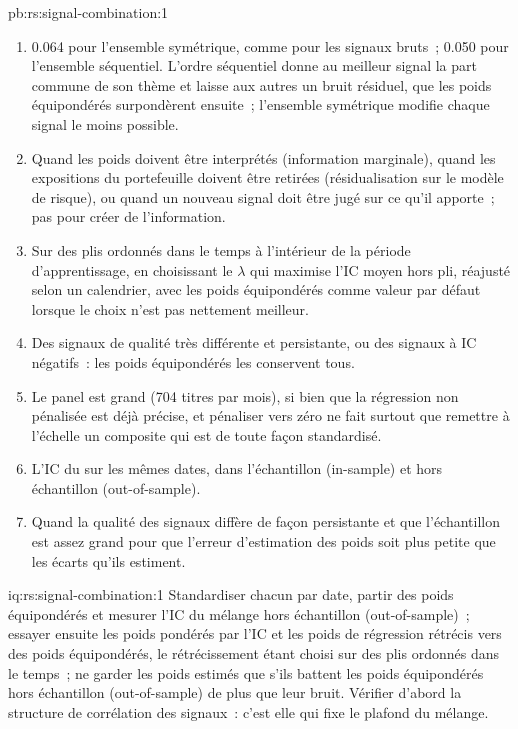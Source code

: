 \begin{solution}{pb:rs:signal-combination:1}
\begin{enumerate}
que ne le permet la diversification de leurs erreurs, et ici une seule base dominait.
\item 0.064 pour l'ensemble symétrique, comme pour les signaux bruts~; 0.050 pour l'ensemble séquentiel. L'ordre séquentiel donne au meilleur signal la
part commune de son thème et laisse aux autres un bruit résiduel, que les poids équipondérés surpondèrent ensuite~; l'ensemble symétrique modifie chaque signal le moins possible.
\item Quand les poids doivent être interprétés (information marginale), quand les expositions du portefeuille doivent être retirées (résidualisation sur le modèle de risque), ou quand un nouveau
signal doit être jugé sur ce qu'il apporte~; pas pour créer de l'information.
\item Sur des plis ordonnés dans le temps à l'intérieur de la période d'apprentissage, en choisissant le $\lambda$ qui maximise l'IC moyen hors pli, réajusté selon un calendrier, avec
les poids équipondérés comme valeur par défaut lorsque le choix n'est pas nettement meilleur.
\item Des signaux de qualité très différente et persistante, ou des signaux à IC négatifs~: les poids équipondérés les conservent tous.
\item Le panel est grand (704 titres par mois), si bien que la régression non pénalisée est déjà précise, et pénaliser vers zéro ne fait surtout que remettre à l'échelle un composite
qui est de toute façon standardisé.
\item L'IC du  sur les mêmes dates, dans l'échantillon (in-sample) et hors échantillon (out-of-sample).
\item Quand la qualité des signaux diffère de façon persistante et que l'échantillon est assez grand pour que l'erreur d'estimation des poids soit plus petite que les écarts
qu'ils estiment.
\end{enumerate}
\end{solution}

\begin{solution}{iq:rs:signal-combination:1}
Standardiser chacun par date, partir des poids équipondérés et mesurer l'IC du mélange hors échantillon (out-of-sample)~; essayer ensuite les poids pondérés par l'IC et les poids de régression rétrécis vers
des poids équipondérés, le rétrécissement étant choisi sur des plis ordonnés dans le temps~; ne garder les poids estimés que s'ils battent les poids équipondérés hors échantillon (out-of-sample) de plus que
leur bruit. Vérifier d'abord la structure de corrélation des signaux~: c'est elle qui fixe le plafond du mélange.
\end{solution}

